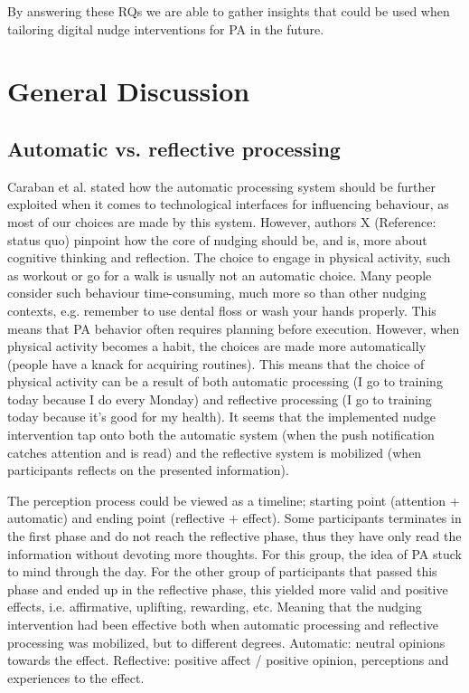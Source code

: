 By answering these RQs we are able to gather insights that could be used when tailoring digital nudge interventions for PA in the future. 

\section{General Discussion}

\subsection{Automatic vs. reflective processing}
Caraban et al. stated how the automatic processing system should be further exploited when it comes to technological interfaces for influencing behaviour, as most of our choices are made by this system. However, authors X (Reference: status quo) pinpoint how the core of nudging should be, and is, more about cognitive thinking and reflection. The choice to engage in physical activity, such as workout or go for a walk is usually not an automatic choice. Many people consider such behaviour time-consuming, much more so than other nudging contexts, e.g. remember to use dental floss or wash your hands properly. This means that PA behavior often requires planning before execution. However, when physical activity becomes a habit, the choices are made more automatically (people have a knack for acquiring routines). This means that the choice of physical activity can be a result of both automatic processing (I go to training today because I do every Monday) and reflective processing (I go to training today because it's good for my health). It seems that the implemented nudge intervention tap onto both the automatic system (when the push notification catches attention and is read) and the reflective system is mobilized (when participants reflects on the presented information). 

The perception process could be viewed as a timeline; starting point (attention + automatic) and ending point (reflective + effect). Some participants terminates in the first phase and do not reach the reflective phase,  thus they have only read the information without devoting more thoughts. For this group, the idea of PA stuck to mind through the day. For the other group of participants that passed this phase and ended up in the reflective phase, this yielded more valid and positive effects, i.e. affirmative, uplifting, rewarding, etc. Meaning that the nudging intervention had been effective both when automatic processing and reflective processing was mobilized, but to different degrees. Automatic: neutral opinions towards the effect. Reflective: positive affect / positive opinion, perceptions and experiences to the effect. 

